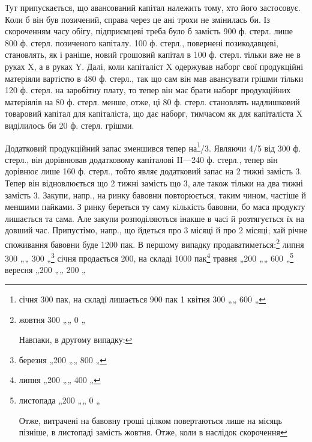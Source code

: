 Тут припускається, що авансований капітал належить тому, хто його
застосовує. Коли б він був позичений, справа через це ані трохи не змінилась
би. Із скороченням часу обігу, підприємцеві треба було б замість
900 ф. стерл. лише 800 ф. стерл. позиченого капіталу. 100 ф. стерл.,
повернені позикодавцеві, становлять, як і раніше, новий грошовий капітал
в 100 ф. стерл. тільки вже не в руках X, а в руках Y. Далі, коли
капіталіст X одержував наборг свої продукційні матеріяли вартістю в
480 ф. стерл., так що сам він мав авансувати грішми тільки 120 ф. стерл.
на заробітну плату, то тепер він має брати наборг продукційних матеріялів
на 80 ф. стерл. менше, отже, ці 80 ф. стерл. становлять надлишковий
товаровий капітал для капіталіста, що дає наборг, тимчасом як
для капіталіста X виділилось би 20 ф. стерл. грішми.

Додатковий продукційний запас зменшився тепер на\footnote{
січня 300 пак, на складі лишається 900 пак
1 квітня 300 „„    600 „
}/3. Являючи 4/5
від 300 ф. стерл., він дорівнював додатковому капіталові II—240 ф.
стерл., тепер він дорівнює лише 160 ф. стерл., тобто являє додатковий
запас на 2 тижні замість 3. Тепер він відновлюється що 2 тижні замість
що 3, але також тільки на два тижні замість 3. Закупи, напр., на ринку
бавовни повторюється, таким чином, частіше й меншими пайками. З ринку
береться ту саму кількість бавовни, бо маса продукту лишається та
сама. Але закупи розподіляються інакше в часі й розтягується їх на довший
час. Припустімо, напр., що йдеться про 3 місяці й про 2 місяці; хай
річне споживання бавовни буде 1200 пак. В першому випадку продаватиметься:\footnote{
жовтня 300 „„    0 „

Навпаки, в другому випадку:
} липня 300 „„    300 „\footnote{
березня „200 „„    800 „
} січня продається 200, на    складі    1000    пак\footnote{
липня „200 „„    400 „
} травня „200 „„    600 „\footnote{
листопада „200 „„    0 „

Отже, витрачені на бавовну гроші цілком повертаються лише на місяць
пізніше, в листопаді замість жовтня. Отже, коли в наслідок скорочення
} вересня „200 „„    200 „
\parbreak{}  %
